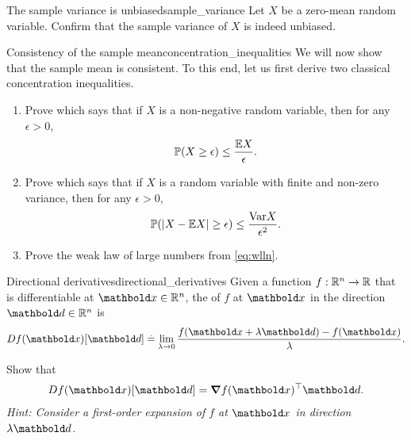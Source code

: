 \excheading

\begin{nexercise}{The sample variance is unbiased}{sample_variance}
  Let $X$ be a zero-mean random variable.
  Confirm that the sample variance of $X$ is indeed unbiased.
\end{nexercise}

\begin{nexercise}{Consistency of the sample mean}{concentration_inequalities}
  We will now show that the sample mean is consistent.
  To this end, let us first derive two classical concentration inequalities. \begin{enumerate}
    \item Prove  which says that if $X$ is a non-negative random variable, then for any $\epsilon > 0$, \begin{align}
      \Pr{X \geq \epsilon} \leq \frac{\E*{X}}{\epsilon}. \label{eq:markov_inequality}
    \end{align}

    \item Prove  which says that if $X$ is a random variable with finite and non-zero variance, then for any $\epsilon > 0$, \begin{align}
      \Pr{\abs{X - \E*{X}} \geq \epsilon} \leq \frac{\Var*{X}}{\epsilon^2}. \label{eq:chebyshev_inequality}
    \end{align}

    \item Prove the weak law of large numbers from \cref{eq:wlln}.
  \end{enumerate}
\end{nexercise}

\begin{nexercise}{Directional derivatives}{directional_derivatives}
  Given a function $f : \mathbb{R}^n \to \mathbb{R}$ that is differentiable at $\vx \in \R^n$, the  of $f$ at $\vx$ in the direction $\vd \in \R^n$ is \begin{align}
    D f(\vx)[\vd] \defeq \lim_{\lambda \to 0} \frac{f(\vx + \lambda\vd) - f(\vx)}{\lambda}.
  \end{align}

  Show that \begin{align}
    D f(\vx)[\vd] = \transpose{\grad f(\vx)} \vd.
  \end{align}
  \textit{Hint: Consider a first-order expansion of $f$ at $\vx$ in direction $\lambda\vd$.}
\end{nexercise}
